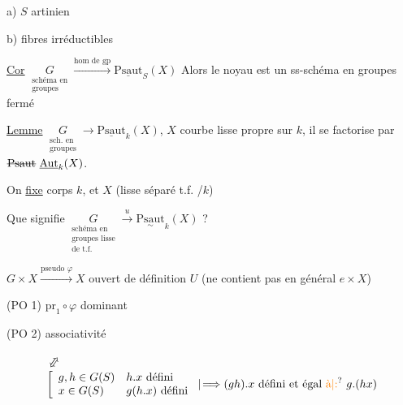 a) $S$ artinien

b) fibres  irréductibles

\uline{Cor} \(\underset{\substack{\text{schéma en}\\\text{groupes}}}{G}\xrightarrow{\text{hom de gp}}\underline{\mathrm{Psaut}}_S(X)\) Alors le noyau est un ss-schéma en groupes fermé



\uline{Lemme} \(\underset{\substack{\text{sch. en}\\\text{groupes}}}{G}\longrightarrow\underline{\mathrm{Psaut}}_k(X)\), $X$ courbe lisse propre sur $k$, il se factorise par $\deleted{\mathrm{Psaut}}\ \underline{\mathrm{Aut}}_k(X)$.

On \uline{fixe} corps $k$, et $X$ (lisse séparé t.f. /$k$)

Que signifie \(\underset{\substack{\text{schéma en}\\\text{groupes lisse}\\\text{de t.f.}}}{G}\xrightarrow{u}\underset{\sim}{\mathrm{Psaut}}_k(X)\) ?

\(G\times X\xrightarrow{\text{pseudo }\varphi} X\) ouvert de définition $U$ (ne contient pas en général $e\times X$)

(PO 1) \(\mathrm{pr}_1\circ\varphi\) dominant

(PO 2) associativité


\[
\begin{aligned}
&\mathrel{\rotatebox{-35}{$\Updownarrow$}}\\[-2pt]
&\left[\begin{array}{ll}
g,h\in G(S) & h.x\ \text{défini}\\
x\in G(S) & g(h.x)\ \text{défini}
\end{array}\right.
\mathrel{\vert\!\Longrightarrow}(gh).x\ \text{défini et égal \unsure{à|:} }g.(hx)
\end{aligned}
\]

